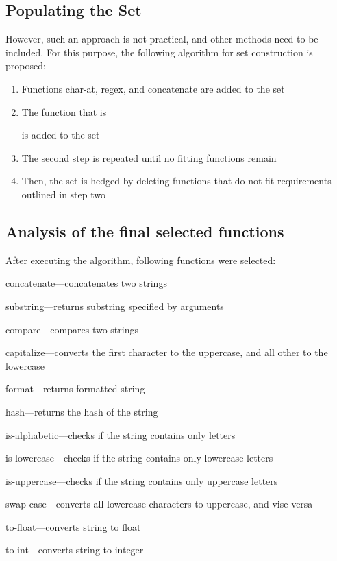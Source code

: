 \documentclass[11pt,nonacm,natbib=false]{acmart}
\begin{document}
\subsection{Populating the Set}
However, such an approach is not practical, and other methods need to be  included. For this purpose, the following algorithm for set construction is proposed:
\begin{enumerate}
    \item Functions char-at, regex, and concatenate are added to the set
    \item The function that is 
        is added to the set
    \item The second step is repeated until no fitting functions remain
    \item Then, the set is hedged by deleting functions that do not fit requirements outlined in step two
\end{enumerate}
\subsection{Analysis of the final selected functions}
After executing the algorithm, following functions were selected:
\begin{inparaenum}
    \item concatenate---concatenates two strings
    \item substring---returns substring specified by arguments
    \item compare---compares two strings
    \item capitalize---converts the first character to the uppercase, and all other to the lowercase
    \item format---returns formatted string
    \item hash---returns the hash of the string
    \item is-alphabetic---checks if the string contains only letters
    \item is-lowercase---checks if the string contains only lowercase letters
    \item is-uppercase---checks if the string contains only uppercase letters
    \item swap-case---converts all lowercase characters to uppercase, and vise versa
    \item to-float---converts string to float
    \item to-int---converts string to integer
\end{inparaenum}
   
\end{document}
